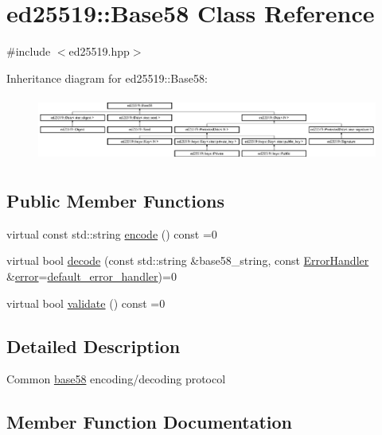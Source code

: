 \hypertarget{classed25519_1_1_base58}{}\section{ed25519\+::Base58 Class Reference}
\label{classed25519_1_1_base58}


{\ttfamily \#include $<$ed25519.\+hpp$>$}

Inheritance diagram for ed25519\+::Base58\+:\begin{figure}[H]
\begin{center}
\leavevmode
\includegraphics[height=2.162162cm]{classed25519_1_1_base58}
\end{center}
\end{figure}
\subsection*{Public Member Functions}
\begin{DoxyCompactItemize}
\item 
virtual const std\+::string \mbox{\hyperlink{classed25519_1_1_base58_a1b52a018a5215e2dcf2aa388b0fe06bf}{encode}} () const =0
\item 
virtual bool \mbox{\hyperlink{classed25519_1_1_base58_a3cb74be32923dcfb03a24b65015bee84}{decode}} (const std\+::string \&base58\+\_\+string, const \mbox{\hyperlink{namespaceed25519_a6ba572942b3c18591fc869d52a6b16e6}{Error\+Handler}} \&\mbox{\hyperlink{namespaceed25519_ac93d0b5156eaca22197055e902920bc4}{error}}=\mbox{\hyperlink{namespaceed25519_a7c7bb6ed17541162959c33ed3e3b15fb}{default\+\_\+error\+\_\+handler}})=0
\item 
virtual bool \mbox{\hyperlink{classed25519_1_1_base58_addfdb1d6d0f7e7f0cd0cf5dd2ee193bb}{validate}} () const =0
\end{DoxyCompactItemize}


\subsection{Detailed Description}
Common \mbox{\hyperlink{namespaceed25519_1_1base58}{base58}} encoding/decoding protocol 

\subsection{Member Function Documentation}
\mbox{\label{classed25519_1_1_base58_a3cb74be32923dcfb03a24b65015bee84}} 
